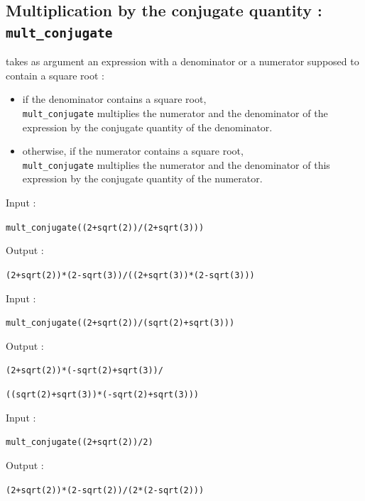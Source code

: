 \documentclass[a4paper,11pt]{book}
\begin{document}
\subsection{Multiplication by the conjugate quantity : \\
{\tt mult\_conjugate}} 
 takes as argument an expression  with a 
denominator or a numerator supposed to contain a square root :
\begin{itemize}
\item if the denominator contains a square root,\\
{\tt mult\_conjugate} multiplies the numerator and the denominator
of the expression by the conjugate quantity of the denominator.
\item otherwise, if the numerator contains a square root,\\
{\tt mult\_conjugate} multiplies the numerator and the denominator of this 
expression by the  conjugate quantity of the numerator. 
\end{itemize}
Input :
\begin{center}{\tt mult\_conjugate((2+sqrt(2))/(2+sqrt(3)))}\end{center}
Output :
\begin{center}{\tt (2+sqrt(2))*(2-sqrt(3))/((2+sqrt(3))*(2-sqrt(3)))}\end{center}
Input :
\begin{center}{\tt mult\_conjugate((2+sqrt(2))/(sqrt(2)+sqrt(3)))}\end{center}
Output :
\begin{center}{\tt (2+sqrt(2))*(-sqrt(2)+sqrt(3))/}\end{center}
\begin{center}{\tt ((sqrt(2)+sqrt(3))*(-sqrt(2)+sqrt(3)))}\end{center}
Input :
\begin{center}{\tt mult\_conjugate((2+sqrt(2))/2)}\end{center}
Output :
\begin{center}{\tt (2+sqrt(2))*(2-sqrt(2))/(2*(2-sqrt(2)))}\end{center}
\end{document}
